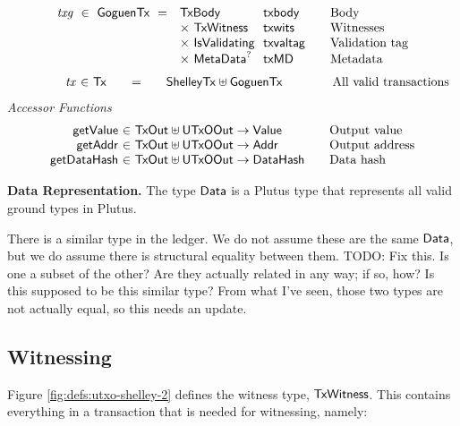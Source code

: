 \begin{figure*}[htb]
\begin{equation*}
\begin{array}{r@{~~}l@{~~}l@{\qquad}l}
      \var{txg} ~\in~ \GoguenTx ~=~
      & \TxBody & \fun{txbody} & \text{Body}\\
      & \times ~\TxWitness & \fun{txwits} & \text{Witnesses}\\
      & \times ~\IsValidating & \fun{txvaltag}&\text{Validation tag}\\
      & \times ~\MetaData^? & \fun{txMD}&\text{Metadata}\\
    \end{array}
  \end{equation*}
  \begin{equation*}
    \begin{array}{r@{~\in~}l@{\qquad=\qquad}l@{\qquad\qquad}l}
\qquad\qquad      \var{tx} & \Tx & \ShelleyTx \uniondistinct \GoguenTx &
      \text{All valid transactions}\\
    \end{array}
  \end{equation*}
  \emph{Accessor Functions}
  \begin{equation*}
    \begin{array}{r@{~\in~}l@{\qquad}l}
      \fun{getValue} & \TxOut \uniondistinct \UTxOOut \to \Value & \text{Output value} \\
      \fun{getAddr} & \TxOut \uniondistinct \UTxOOut \to \Addr & \text{Output address} \\
      \fun{getDataHash} & \TxOut \uniondistinct \UTxOOut \to \DataHash & \text{Data hash}
    \end{array}
  \end{equation*}
  \caption{Definitions for transactions, cont.}
  \label{fig:defs:utxo-shelley-2}
\end{figure*}


\textbf{Data Representation.}
The type $\mathsf{Data}$ is a Plutus type that represents all valid ground types in Plutus.
\begin{note}
There is a similar type in the
ledger. We do not assume these are the same $\mathsf{Data}$, but we do assume there
is structural equality between them. TODO: {Fix this.  Is one a subset of the other?  Are they actually related in any way; if so, how?}
  Is this supposed to be this similar type? From what I've seen, those
  two types are not actually equal, so this needs an update.
\end{note}

\subsection{Witnessing}
Figure \ref{fig:defs:utxo-shelley-2} defines the witness type, $\mathsf{TxWitness}$.  This contains everything
in a transaction that is needed for witnessing, namely:

